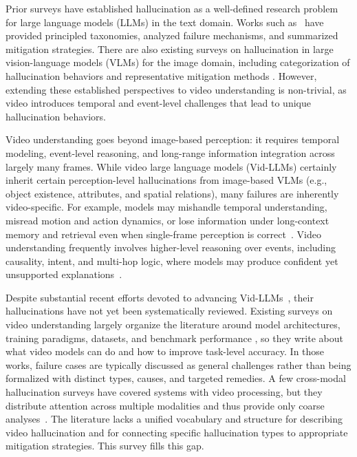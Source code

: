 \documentclass[10pt]{article} %
\begin{document}
Prior surveys have established hallucination as a well-defined research problem for large language models (LLMs) in the text domain. Works such as~\citep{huang2025survey,tonmoy2024comprehensive} have provided principled taxonomies, analyzed failure mechanisms, and summarized mitigation strategies. There are also existing surveys on hallucination in large vision-language models (VLMs) for the image domain, including categorization of hallucination behaviors and representative mitigation methods \citep{liu2024survey,bai2024hallucination}. However, extending these established perspectives to video understanding is non-trivial, as video introduces temporal and event-level challenges that lead to unique hallucination behaviors.

Video understanding goes beyond image-based perception: it requires temporal modeling, event-level reasoning, and long-range information integration across largely many frames. While video large language models (Vid-LLMs) certainly inherit certain perception-level hallucinations from image-based VLMs (e.g., object existence, attributes, and spatial relations), many failures are inherently video-specific. For example, models may mishandle temporal understanding, misread motion and action dynamics, or lose information under long-context memory and retrieval even when single-frame perception is correct~\citep{chang2025mitigating, tang2025can}. Video understanding frequently involves higher-level reasoning over events, including causality, intent, and multi-hop logic, where models may produce confident yet unsupported explanations~\citep{jiang2025videop2r}. 

Despite substantial recent efforts devoted to advancing Vid-LLMs~\citep{tang2025video, nguyen2024video}, their hallucinations have not yet been systematically reviewed. Existing surveys on video understanding largely organize the literature around model architectures, training paradigms, datasets, and benchmark performance \citep{nguyen2024video,tang2025video,zhong2022video,zhou2024survey,madan2024foundation,zou2024seconds}, so they write about what video models can do and how to improve task-level accuracy. In those works, failure cases are typically discussed as general challenges rather than being formalized with distinct types, causes, and targeted remedies. A few cross-modal hallucination surveys have covered systems with video processing, but they distribute attention across multiple modalities and thus provide only coarse analyses~\citep{sahoo2024comprehensive, xia2025rethinking}. The literature lacks a unified vocabulary and structure for describing video hallucination and for connecting specific hallucination types to appropriate mitigation strategies. This survey fills this gap.
\end{document}
